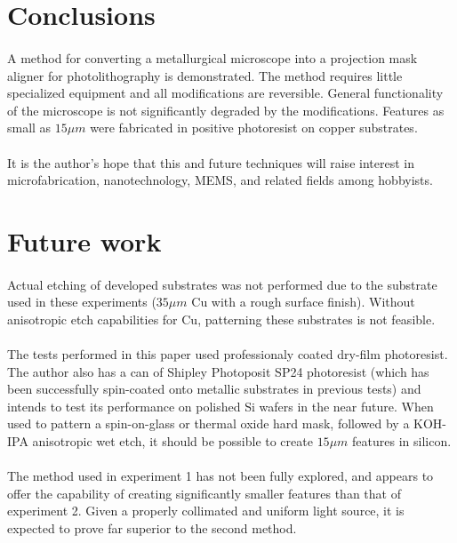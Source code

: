 \documentclass[twocolumn]{article}
\begin{document}
\section{Conclusions}
\paragraph*{}
A method for converting a metallurgical microscope into a projection mask aligner for photolithography is demonstrated.
The method requires little specialized equipment and all modifications are reversible. General functionality of the
microscope is not significantly degraded by the modifications. Features as small as $15 \mu m$ were fabricated in
positive photoresist on copper substrates.

\paragraph*{}
It is the author's hope that this and future techniques will raise interest in microfabrication, nanotechnology, MEMS,
and related fields among hobbyists.

\section{Future work}
\paragraph*{}
Actual etching of developed substrates was not performed due to the substrate used in these experiments ($35 \mu m$ Cu
with a rough surface finish). Without anisotropic etch capabilities for Cu, patterning these substrates is not feasible.

\paragraph*{}
The tests performed in this paper used professionaly coated dry-film photoresist. The author also has a can of
Shipley Photoposit SP24 photoresist (which has been successfully spin-coated onto metallic substrates in previous tests)
and intends to test its performance on polished Si wafers in the near future. When used to pattern a spin-on-glass or 
thermal oxide hard mask, followed by a KOH-IPA anisotropic wet etch, it should be possible to create $15 \mu m$ features
in silicon.

\paragraph*{}
The method used in experiment 1 has not been fully explored, and appears to offer the capability of creating
significantly smaller features than that of experiment 2. Given a properly collimated and uniform light source, it is
expected to prove far superior to the second method.
\end{document}
